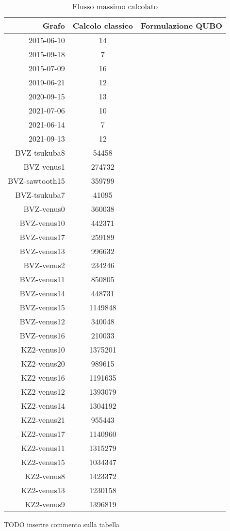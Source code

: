 \documentclass{article}
\begin{document}
\begin{table}
    \caption{Flusso massimo calcolato}\label{tabella_valori}
    \centering
    \begin{tabular}{|r|c|c|}
    \hline
        Grafo & Calcolo classico & Formulazione QUBO \\ \hline
        2015-06-10 & 14 & \\ \hline
        2015-09-18 & 7 & \\ \hline
        2015-07-09 & 16 & \\ \hline
        2019-06-21 & 12 & \\ \hline
        2020-09-15 & 13 & \\ \hline
        2021-07-06 & 10 & \\ \hline
        2021-06-14 & 7 & \\ \hline
        2021-09-13 & 12 & \\ \hline\hline
        BVZ-tsukuba8 & 54458 & \\ \hline
        BVZ-venus1 & 274732 & \\ \hline
        BVZ-sawtooth15 & 359799 & \\ \hline
        BVZ-tsukuba7 & 41095 & \\ \hline
        BVZ-venus0 & 360038 & \\ \hline
        BVZ-venus10 & 442371 & \\ \hline
        BVZ-venus17 & 259189 & \\ \hline
        BVZ-venus13 & 996632 & \\ \hline
        BVZ-venus2 & 234246 & \\ \hline
        BVZ-venus11 & 850805 & \\ \hline
        BVZ-venus14 & 448731 & \\ \hline
        BVZ-venus15 & 1149848 & \\ \hline
        BVZ-venus12 & 340048 & \\ \hline
        BVZ-venus16 & 210033 & \\ \hline
        KZ2-venus10 & 1375201 & \\ \hline
        KZ2-venus20 & 989615 & \\ \hline
        KZ2-venus16 & 1191635 & \\ \hline
        KZ2-venus12 & 1393079 & \\ \hline
        KZ2-venus14 & 1304192 & \\ \hline
        KZ2-venus21 & 955443 & \\ \hline
        KZ2-venus17 & 1140960 & \\ \hline
        KZ2-venus11 & 1315279 & \\ \hline
        KZ2-venus15 & 1034347 & \\ \hline
        KZ2-venus8 & 1423372 & \\ \hline
        KZ2-venus13 & 1230158 & \\ \hline
        KZ2-venus9 & 1396819 & \\ \hline
    \end{tabular}
\end{table}

\pagebreak

TODO inserire commento sulla tabella



\end{document}
